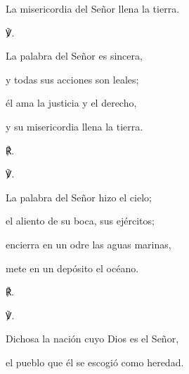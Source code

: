 			\begin{readtheme}La misericordia del Señor llena la tierra.\end{readtheme}
			
			\begin{readbody}\begin{readred}℣.\end{readred} La palabra del Señor es sincera, \end{readbody}
			
			\begin{readtabbed}y todas sus acciones son leales; \end{readtabbed}
			
			\begin{readtabbed}él ama la justicia y el derecho, \end{readtabbed}
			
			\begin{readtabbed}y su misericordia llena la tierra. \begin{readred}℟.\end{readred}\end{readtabbed}
			
			\begin{readbody}\begin{readred}℣.\end{readred} La palabra del Señor hizo el cielo; \end{readbody}
			
			\begin{readtabbed}el aliento de su boca, sus ejércitos; \end{readtabbed}
			
			\begin{readtabbed}encierra en un odre las aguas marinas, \end{readtabbed}
			
			\begin{readtabbed}mete en un depósito el océano.\begin{readred}℟.\end{readred}\end{readtabbed}
			
			\begin{readbody}\begin{readred}℣.\end{readred} Dichosa la nación cuyo Dios es el Señor, \end{readbody}
			
			\begin{readtabbed}el pueblo que él se escogió como heredad. \end{readtabbed}
			
